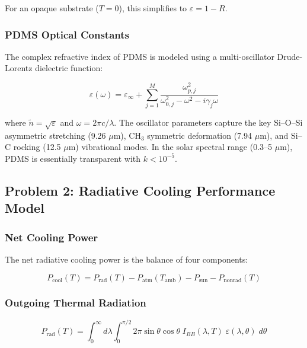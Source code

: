 For an opaque substrate ($T=0$), this simplifies to $\varepsilon = 1 - R$.

\subsubsection{PDMS Optical Constants}

The complex refractive index of PDMS is modeled using a multi-oscillator Drude-Lorentz dielectric function:

\begin{equation}
  \varepsilon(\omega) = \varepsilon_{\infty} + \sum_{j=1}^{M} \frac{\omega_{p,j}^2}{\omega_{0,j}^2 - \omega^2 - i\gamma_j\omega}
  \label{eq:drude_lorentz}
\end{equation}

where $\tilde{n} = \sqrt{\varepsilon}$ and $\omega = 2\pi c / \lambda$. The oscillator parameters capture the key Si--O--Si asymmetric stretching (9.26 $\mu$m), CH$_3$ symmetric deformation (7.94 $\mu$m), and Si--C rocking (12.5 $\mu$m) vibrational modes. In the solar spectral range (0.3--5 $\mu$m), PDMS is essentially transparent with $k < 10^{-5}$.

\subsection{Problem 2: Radiative Cooling Performance Model}

\subsubsection{Net Cooling Power}

The net radiative cooling power is the balance of four components:

\begin{equation}
  P_{\text{cool}}(T) = P_{\text{rad}}(T) - P_{\text{atm}}(T_{\text{amb}}) - P_{\text{sun}} - P_{\text{nonrad}}(T)
  \label{eq:pcool}
\end{equation}

\subsubsection{Outgoing Thermal Radiation}

\begin{equation}
  P_{\text{rad}}(T) = \int_{0}^{\infty} d\lambda \int_{0}^{\pi/2} 2\pi \sin\theta \cos\theta \; I_{BB}(\lambda, T) \; \varepsilon(\lambda, \theta) \; d\theta
  \label{eq:prad}
\end{equation}

